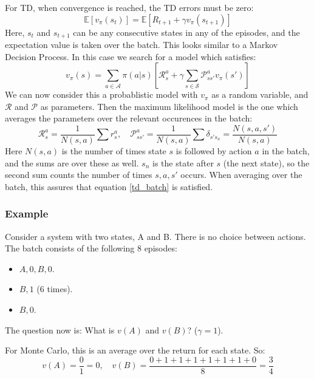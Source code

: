 \documentclass[12pt, a4paper]{article}
\numberwithin{equation}{section}
\begin{document}
For TD, when convergence is reached, the TD errors must be zero:
\begin{equation}
\mathbb{E}\left[v_\pi\left(s_t\right)\right]=\mathbb{E}\left[R_{t+1}+\gamma v_\pi\left(s_{t+1}\right)\right]
\end{equation}
Here, $s_t$ and $s_{t+1}$ can be any consecutive states in any of the episodes, and the expectation value is taken over the batch. This looks similar to a Markov Decision Process. In this case we search for a model which satisfies:
\begin{equation}
v_\pi(s)=\sum_{a\in\mathcal{A}}\pi(a|s)\left[\mathcal{R}^a_s+\gamma\sum_{s\in\mathcal{S}}\mathcal{P}^a_{ss'}v_\pi(s')\right]
\label{td_batch}
\end{equation}
We can now consider this a probablistic model with $v_\pi$ as a random variable, and $\mathcal{R}$ and $\mathcal{P}$ as parameters. Then the maximum likelihood model is the one which averages the parameters over the relevant occurences in the batch:
\begin{equation}
\mathcal{R}^a_s=\frac{1}{N(s,a)}\sum r^a_s,\quad
\mathcal{P}^a_{ss'}=\frac{1}{N(s,a)}\sum\delta_{s's_n}=\frac{N(s,a,s')}{N(s,a)}
\end{equation}
Here $N(s,a)$ is the number of times state $s$ is followed by action $a$ in the batch, and the sums are over these as well. $s_n$ is the state after $s$ (the next state), so the second sum counts the number of times $s,a,s'$ occurs. When averaging over the batch, this assures that equation \ref{td_batch} is satisfied.

\subsubsection{Example}
Consider a system with two states, A and B. There is no choice between actions. The batch consists of the following 8 episodes:
\begin{itemize}
\item $A,0,B,0$.
\item $B,1$ (6 times).
\item $B,0$.
\end{itemize}
The question now is: What is $v(A)$ and $v(B)$? ($\gamma=1$).

For Monte Carlo, this is an average over the return for each state. So:
\begin{equation}
v(A)=\frac{0}{1}=0,\quad v(B)=\frac{0+1+1+1+1+1+1+0}{8}=\frac{3}{4}
\end{equation}
\end{document}
